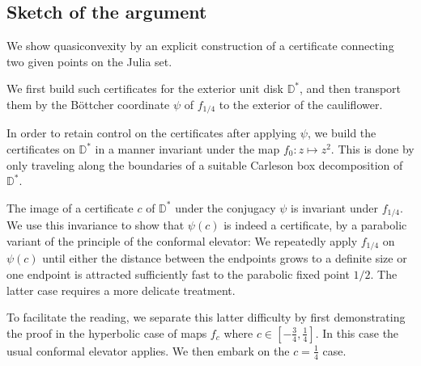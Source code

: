 \begin{comment}
The Filled Julia set of $z^{2}+1/4$, called the cauliflower, has
an inward-pointing cusp and hence is not quasiconvex.
\end{comment}

\begin{comment}
Thus, for any $c$ in 

For values $c$ in quadratic polynomials $f_{c}(z)=z^{2}+c$
\end{comment}
\begin{comment}
If $f_{c}$ has an attracting fixed point then its Julia set $\mathcal{J}(f_{c})$
is a quasicircle, hence its interior and exterior are both quasiconvex.
This is the case for values of $c$ in the main cardioid of the Mandelbrot
set.
, i.e. for 
\[
c\in\left\{ -\frac{\lambda}{2}-\frac{\lambda^{2}}{4}:\,\left|\lambda\right|<1\right\} .
\]
\end{comment}

\subsection{Sketch of the argument}

We show quasiconvexity by an explicit construction of a certificate connecting two given points on the Julia set.

We first build such certificates for the exterior unit disk $\mathbb D ^*$, and then transport them by the Böttcher coordinate $\psi$ of $f_{1/4}$ to the exterior of the cauliflower.

In order to retain control on the certificates after applying $\psi$, we build the certificates on $\mathbb D^*$ in a manner invariant under the map $f_0: z\mapsto z^2$. This is done by only traveling along the boundaries of a suitable Carleson box decomposition of $\mathbb D^{*}$. 

The image of a certificate $c$ of $\mathbb D^{*}$ under the conjugacy $\psi$ is invariant under $f_{1/4}$. We use this invariance to show that $\psi(c)$ is indeed a certificate, by a parabolic variant of the principle of the conformal elevator: We repeatedly apply $f_{1/4}$ on $\psi(c)$ until either the distance between the endpoints grows to a definite size or one endpoint is attracted sufficiently fast to the parabolic fixed point $1/2$. The latter case requires a more delicate treatment.

To facilitate the reading, we separate this latter difficulty by first demonstrating the proof in the hyperbolic case of maps $f_c$ where  $c\in\left[-\frac 34,\frac{1}{4}\right]$. In this case the usual conformal elevator applies. We then embark on the $c=\frac 14$ case.

